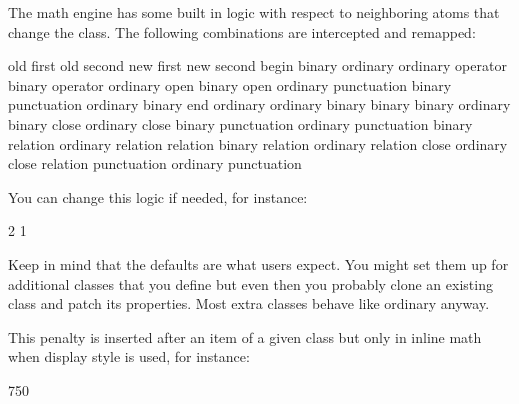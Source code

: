 \stopoldprimitive

\startnewprimitive[title={\prm {setmathatomrule}}]

The math engine has some built in logic with respect to neighboring atoms that
change the class. The following combinations are intercepted and remapped:

\starttabulate[|c|c|c|c|]
\BC old first   \BC old second  \NC new first   \NC new second  \NC \NR
\ML
\NC begin       \NC binary      \NC ordinary    \NC ordinary    \NC \NR
\NC             \NC             \NC             \NC             \NC \NR
\NC operator    \NC binary      \NC operator    \NC ordinary    \NC \NR
\NC open        \NC binary      \NC open        \NC ordinary    \NC \NR
\NC punctuation \NC binary      \NC punctuation \NC ordinary    \NC \NR
\NC             \NC             \NC             \NC             \NC \NR
\NC binary      \NC end         \NC ordinary    \NC ordinary    \NC \NR
\NC binary      \NC binary      \NC binary      \NC ordinary    \NC \NR
\NC binary      \NC close       \NC ordinary    \NC close       \NC \NR
\NC binary      \NC punctuation \NC ordinary    \NC punctuation \NC \NR
\NC binary      \NC relation    \NC ordinary    \NC relation    \NC \NR
\NC             \NC             \NC             \NC             \NC \NR
\NC relation    \NC binary      \NC relation    \NC ordinary    \NC \NR
\NC relation    \NC close       \NC ordinary    \NC close       \NC \NR
\NC relation    \NC punctuation \NC ordinary    \NC punctuation \NC \NR
\stoptabulate

You can change this logic if needed, for instance:

\starttyping
{} 2  1
\stoptyping

Keep in mind that the defaults are what users expect. You might set them up for
additional classes that you define but even then you probably clone an existing
class and patch its properties. Most extra classes behave like ordinary anyway.

\stopnewprimitive

\startnewprimitive[title={\prm {setmathdisplaypostpenalty}}]

This penalty is inserted after an item of a given class but only in inline math
when display style is used, for instance:

\starttyping
{} 750
\stoptyping

\stopnewprimitive

\startnewprimitive[title={\prm {setmathdisplayprepenalty}}]


